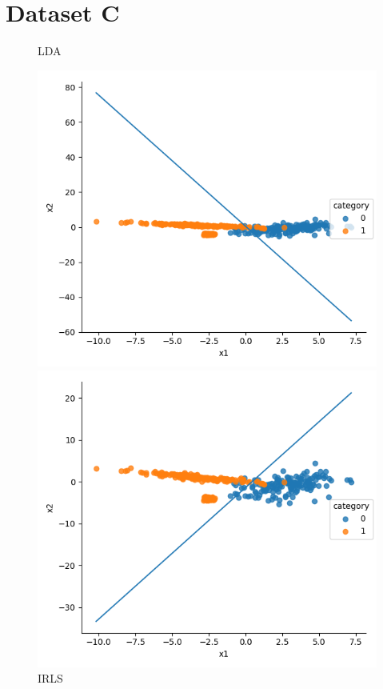 \documentclass[a4paper]{article}
\begin{document}
\section{Dataset C}
\begin{figure}[h]
\centering
\begin{minipage}{0,45\textwidth}
\caption{LDA}
\includegraphics[scale=.4]{c_lda.png}
\end{minipage}
\begin{minipage}{0,45\textwidth}
\caption{IRLS}
\includegraphics[scale=.4]{c_irls.png}

\end{minipage}
\end{figure}
\end{document}
